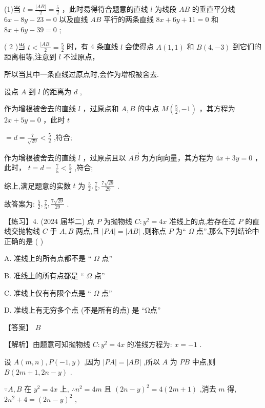 \documentclass[10pt]{article}
\newcommand*\circled[1]{\tikz[baseline=(char.base)]{\node[shape=circle,draw,inner sep=1.5pt] (char) {\small #1};}}
\begin{document}
(1)当 \(t = \frac{\left| AB\right| }{2} = \frac{5}{2}\) ，此时易得符合题意的直线 \(l\) 为线段 \({AB}\) 的垂直平分线 \({6x} - {8y} - {23} = 0\) 以及直线 \({AB}\) 平行的两条直线 \({8x} + {6y} + {11} = 0\) 和 \({8x} + {6y} - {39} = 0\) ;

( 2 )当 \(t < \frac{\left| AB\right| }{2} = \frac{5}{2}\) 时，有 4 条直线 \(l\) 会使得点 \(A\left( {1,1}\right)\) 和 \(B\left( {4, - 3}\right)\) 到它们的距离相等,注意到 \(l\) 不过原点，

所以当其中一条直线过原点时,会作为增根被舍去.

设点 \(A\) 到 \(l\) 的距离为 \(d\) ,

 \circled{1} 作为增根被舍去的直线 \(l\) ，过原点和 \(A,B\) 的中点 \(M\left( {\frac{5}{2}, - 1}\right)\) ，其方程为 \({2x} + {5y} = 0\) ，此时 \(t\)

\(= d = \frac{7}{\sqrt{29}} < \frac{5}{2}\) ,符合;

 \circled{2} 作为增根被舍去的直线 \(l\) ，过原点且以 \(\overrightarrow{AB}\) 为方向向量，其方程为 \({4x} + {3y} = 0\) ，此时， \(t = d = \; \frac{7}{5} < \frac{5}{2}\) ,符合;

综上,满足题意的实数 \(t\) 为 \(\frac{5}{2},\frac{7}{5},\frac{7\sqrt{29}}{29}\) .

故答案为: \(\frac{5}{2},\frac{7}{5},\frac{7\sqrt{29}}{29}\) .

【练习】4. (2024 届华二) 点 \(P\) 为抛物线 \(C : {y}^{2} = {4x}\) 准线上的点,若存在过 \(P\) 的直线交抛物线 \(C\) 于 \(A,B\) 两点,且 \(\left| {PA}\right|  = \left| {AB}\right|\) ,则称点 \(P\) 为“ \(\Omega\) 点”,那么下列结论中正确的是 ( )

A. 准线上的所有点都不是 “ \(\Omega\) 点”

B. 准线上的所有点都是 “ \(\Omega\) 点”

C. 准线上仅有有限个点是 “ \(\Omega\) 点”

D. 准线上有无穷多个点 (不是所有的点) 是 “Ω点”

【答案】 \(B\)

【解析】由题意可知抛物线 \(C : {y}^{2} = {4x}\) 的准线方程为: \(x =  - 1\) .

设 \(A\left( {m,n}\right) ,P\left( {-1,y}\right)\) ,因为 \(\left| {PA}\right|  = \left| {AB}\right|\) ,所以 \(A\) 为 \({PB}\) 中点,则 \(B\left( {{2m} + 1,{2n} - y}\right)\) .

\(\because A,B\) 在 \({y}^{2} = {4x}\) 上, \(\therefore {n}^{2} = {4m}\) 且 \({\left( 2n - y\right) }^{2} = 4\left( {{2m} + 1}\right)\) ,消去 \(m\) 得, \(2{n}^{2} + 4 = {\left( 2n - y\right) }^{2}\) ,
\end{document}
